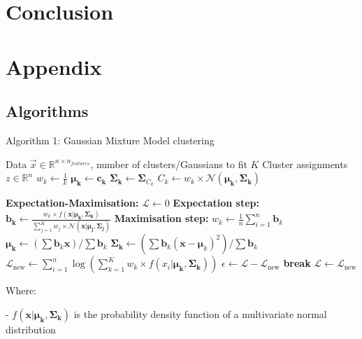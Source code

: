 \documentclass[12pt]{report} %
\begin{document}
\chapter{Conclusion}


\chapter{Appendix}

\section{Algorithms}


\begin{definitionbox}{Algorithm 1: Gaussian Mixture Model clustering}
  \begin{algorithmic}[1]
    \State Data $\vec{x} \in \mathbb{R}^{n \times n_{features}}$, number of clusters/Gaussians to fit $K$ 
    \State Cluster assignments $z \in \mathbb{R}^n$ 
    \State $w_{k} \gets \frac{1}{k}$ 
    \State $\mathbf{\mu_{k}} \gets \mathbf{c_{k}}$ 
    \State $\mathbf{\Sigma_{k}} \gets \mathbf{\Sigma}_{C_{k}}$ 
    \State $C_{k} \gets w_{k} \times \mathcal{N}(\mathbf{\mu_{k}}, \mathbf{\Sigma_{k}})$ 

    \State \textbf{Expectation-Maximisation:}
    \State $\mathcal{L} \gets 0$ 
      \State \textbf{Expectation step:}
        \State $\mathbf{b_{k}} \gets \frac{w_{k} \times f(\mathbf{x}|\mathbf{\mu_{k}}, \mathbf{\Sigma_{k}})}{\sum_{j=1}^{K} w_{j} \times \mathcal{N}(\mathbf{x}|\mathbf{\mu_{j}}, \mathbf{\Sigma_{j}})}$ 
      \EndFor
      \State \textbf{Maximisation step:}
        \State $w_{k} \gets \frac{1}{n} \sum_{i=1}^{n} \mathbf{b}_{k}$ 
        \State $\mathbf{\mu_{k}} \gets (\sum \mathbf{b}_{k}\mathbf{x})/\sum \mathbf{b}_{k}$ 
        \State $\mathbf{\Sigma_{k}} \gets (\sum \mathbf{b}_{k}(\mathbf{x} - \mathbf{\mu}_{k})^{2})/\sum \mathbf{b}_{k}$ 
      \EndFor
      \State $\mathcal{L}_{\text{new}} \gets \sum_{i=1}^{n} \log(\sum_{k=1}^{K} w_{k} \times f(x_{i}|\mathbf{\mu_{k}}, \mathbf{\Sigma_{k}}))$ 
      \State $\epsilon \gets \mathcal{L} - \mathcal{L}_{\text{new}}$ 
        \State \textbf{break}
      \EndIf
      \State $\mathcal{L} \gets \mathcal{L}_{\text{new}}$ 
    \EndFor

  \end{algorithmic}
  Where:

  - $f(\mathbf{x}|\mathbf{\mu_{k}}, \mathbf{\Sigma_{k}})$ is the probability density function of a multivariate normal distribution

  \label{alg:GMM}
\end{definitionbox}
\end{document}
